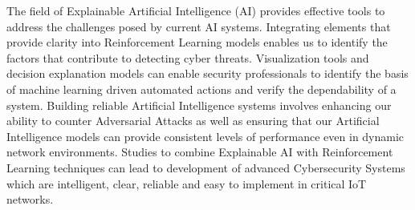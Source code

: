\documentclass[12pt]{article}
\begin{document}
The field of Explainable Artificial Intelligence (AI) provides effective tools to address the challenges posed by current AI systems. Integrating elements that provide clarity into Reinforcement Learning models enables us to identify the factors that contribute to detecting cyber threats. Visualization tools and decision explanation models can enable security professionals to identify the basis of machine learning driven automated actions and verify the dependability of a system. Building reliable Artificial Intelligence systems involves enhancing our ability to counter Adversarial Attacks as well as ensuring that our Artificial Intelligence models can provide consistent levels of performance even in dynamic network environments. Studies to combine Explainable AI with Reinforcement Learning techniques can lead to development of advanced Cybersecurity Systems which are intelligent, clear, reliable and easy to implement in critical IoT networks.\cite{Cevallos2023, Gupta2024, Sharma2023}
	
\end{document}
